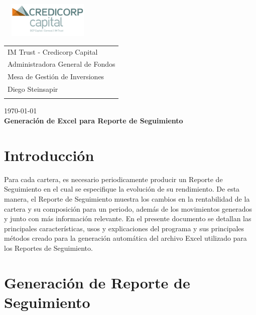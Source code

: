 \documentclass{article}
\begin{document}
\includegraphics[width=4.6cm, height=1.7cm]{logor.png}
\vspace*{-1.55cm}

\hspace*{1.4 cm}
 \hspace*{2.9 cm}
 {\footnotesize
 \begin{tabular}{l}
  \sc IM Trust - Credicorp Capital\\
  \sc Administradora General de Fondos \\
  \sc Mesa de Gestión de Inversiones  \\
  \sc Diego Steinsapir  \\
  \vspace{15\baselineskip}\mbox{}
  \vspace{-3mm}\mbox{}
 \end{tabular}
}

 \bigskip

\vspace*{5mm}
\begin{center}
{\today} \\
\vspace{3mm}
{\Large\bf Generación de Excel para Reporte de Seguimiento} \\
\vspace{2mm}
\end{center}
\section{Introducción}


Para cada cartera, es necesario periodicamente producir un Reporte de Seguimiento en el cual se especifique la evolución de su rendimiento. De esta manera, el Reporte de Seguimiento muestra los cambios en la rentabilidad de la cartera y su composición para un periodo, además de los movimientos generados y junto con más información relevante. En el presente documento se detallan las principales características, usos y explicaciones del programa y sus principales métodos creado para la generación automática del archivo Excel utilizado para los Reportes de Seguimiento.

\section{Generación de Reporte de Seguimiento}
\end{document}

